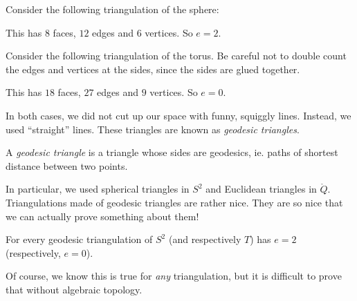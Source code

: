 \documentclass[a4paper]{article}
\begin{document}
\begin{eg}
  Consider the following triangulation of the sphere:
  \begin{center}
  \end{center}
  This has $8$ faces, $12$ edges and $6$ vertices. So $e = 2$.
\end{eg}

\begin{eg}
  Consider the following triangulation of the torus. Be careful not to double count the edges and vertices at the sides, since the sides are glued together.
  \begin{center}
  \end{center}
  This has $18$ faces, $27$ edges and $9$ vertices. So $e = 0$.
\end{eg}
In both cases, we did not cut up our space with funny, squiggly lines. Instead, we used ``straight'' lines. These triangles are known as \emph{geodesic triangles}.

\begin{defi}
  A \emph{geodesic triangle} is a triangle whose sides are geodesics, ie. paths of shortest distance between two points.
\end{defi}
In particular, we used spherical triangles in $S^2$ and Euclidean triangles in $\mathring{Q}$. Triangulations made of geodesic triangles are rather nice. They are so nice that we can actually prove something about them!
\begin{prop}
  For every geodesic triangulation of $S^2$ (and respectively $T$) has $e = 2$ (respectively, $e = 0$).
\end{prop}
Of course, we know this is true for \emph{any} triangulation, but it is difficult to prove that without algebraic topology.
\end{document}
